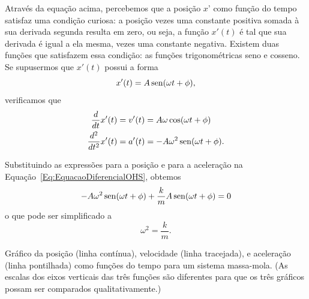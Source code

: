 Através da equação acima, percebemos que a posição $x$' como função do tempo satisfaz uma condição curiosa: a posição vezes uma constante positiva somada à  sua derivada segunda resulta em zero, ou seja, a função $x'(t)$ é tal que sua derivada é igual a ela mesma, vezes uma constante negativa. Existem duas funções que satisfazem essa condição: as funções trigonométricas seno e cosseno. Se supusermos que $x'(t)$ possui a forma
\begin{equation}
	x'(t) = A\operatorname{sen}(\omega t + \phi),
\end{equation}
%
verificamos que
\begin{align}
	\frac{d}{dt}x'(t) &= v'(t) = A\omega\cos(\omega t + \phi) \\
	\frac{d^2}{dt^2} x'(t) &= a'(t) = -A\omega^2\operatorname{sen}(\omega t + \phi).
\end{align}


%
Substituindo as expressões para a posição e para a aceleração na Equação~\eqref{Eq:EquacaoDiferencialOHS}, obtemos
\begin{equation}
	-A\omega^2\operatorname{sen}(\omega t + \phi) + \frac{k}{m}A\operatorname{sen}(\omega t + \phi) = 0
\end{equation}
%
o que pode ser simplificado a
\begin{equation}
	\omega^2 = \frac{k}{m}.
\end{equation}

\begin{marginfigure}
\centering
{}
\caption{Gráfico da posição (linha contínua), velocidade (linha tracejada), e aceleração (linha pontilhada) como funções do tempo para um sistema massa-mola. (As escalas dos eixos verticais das três funções são diferentes para que os três gráficos possam ser comparados qualitativamente.)}
\end{marginfigure}

